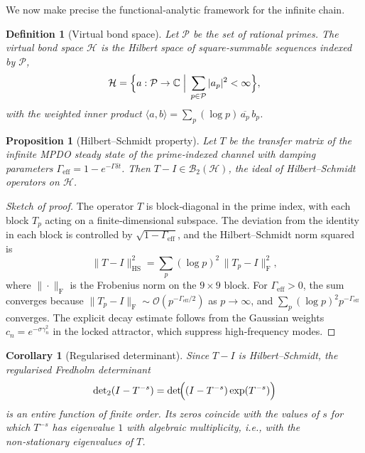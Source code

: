 \documentclass[11pt,a4paper]{article}
\newtheorem{proposition}{Proposition}
\newtheorem{definition}{Definition}
\newtheorem{corollary}{Corollary}
\begin{document}
We now make precise the functional‑analytic framework for the infinite chain.

\begin{definition}[Virtual bond space]
Let $\mathcal{P}$ be the set of rational primes.  The virtual bond space $\mathcal{H}$ is the Hilbert space of square‑summable sequences indexed by $\mathcal{P}$,
\[
\mathcal{H} = \Bigl\{ a : \mathcal{P} \to \mathbb{C} \;\Big|\; \sum_{p\in\mathcal{P}} |a_p|^2 < \infty \Bigr\},
\]
with the weighted inner product $\langle a,b\rangle = \sum_p (\log p)\, \overline{a_p}\, b_p$.
\end{definition}

\begin{proposition}[Hilbert–Schmidt property]\label{prop:hilbert-schmidt}
Let $T$ be the transfer matrix of the infinite MPDO steady state of the prime‑indexed channel with damping parameters $\Gamma_{\mathrm{eff}} = 1-e^{-\Gamma\delta t}$.  Then $T - I \in \mathcal{B}_2(\mathcal{H})$, the ideal of Hilbert–Schmidt operators on $\mathcal{H}$.
\end{proposition}

\begin{proof}[Sketch of proof]
The operator $T$ is block‑diagonal in the prime index, with each block $T_p$ acting on a finite‑dimensional subspace.  The deviation from the identity in each block is controlled by $\sqrt{1-\Gamma_{\mathrm{eff}}}$, and the Hilbert–Schmidt norm squared is
\[
\|T-I\|_{\mathrm{HS}}^2 = \sum_{p} (\log p)^2 \, \|T_p - I\|_{\mathrm{F}}^2,
\]
where $\|\cdot\|_{\mathrm{F}}$ is the Frobenius norm on the $9\times 9$ block.  For $\Gamma_{\mathrm{eff}}>0$, the sum converges because $\|T_p - I\|_{\mathrm{F}} \sim \mathcal{O}(p^{-\Gamma_{\mathrm{eff}}/2})$ as $p\to\infty$, and $\sum_p (\log p)^2 p^{-\Gamma_{\mathrm{eff}}}$ converges.  The explicit decay estimate follows from the Gaussian weights $c_n = e^{-\sigma \gamma_n^2}$ in the locked attractor, which suppress high‑frequency modes.
\end{proof}

\begin{corollary}[Regularised determinant]
Since $T-I$ is Hilbert–Schmidt, the regularised Fredholm determinant
\[
\det\nolimits_2(I - T^{-s}) = \det\!\Bigl( (I - T^{-s}) \exp(T^{-s}) \Bigr)
\]
is an entire function of finite order.  Its zeros coincide with the values of $s$ for which $T^{-s}$ has eigenvalue $1$ with algebraic multiplicity, i.e., with the non‑stationary eigenvalues of $T$.
\end{corollary}
\end{document}
